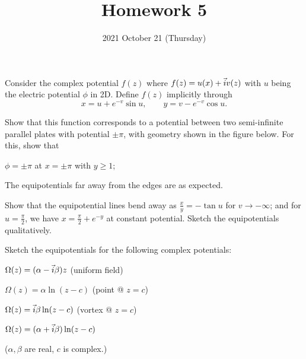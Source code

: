 \documentclass{phys151}
\title{Homework 5}
\date{2021 October 21 (Thursday)}
\author{}
\begin{document}
\begin{problem}
  Consider the complex potential \(f(z)\) where \(f(z) = u(x) + \vec i v(z)\) with
  \(u\) being the electric potential \(\phi\) in 2D.  Define \(f(z)\)
  implicitly through
  \[
    x = u + e^{-v} \sin u, \qquad y = v - e^{-v} \cos u.
  \]
  \begin{subproblems}
  \item Show that this function corresponds to a potential between two
    semi-infinite parallel plates with potential \(\pm\pi\), with geometry
    shown in the figure below.  For this, show that
    \begin{subproblems}
    \item \(\phi = \pm\pi\) at \(x = \pm\pi\) with \(y\ge1\);
    \item The equipotentials far away from the edges are as expected.
    \end{subproblems}
  \item Show that the equipotential lines bend away as \(\frac x y = -\tan
    u\) for \(v \to -\infty\); and for \(u = \frac \pi 2\), we have \(x =
    \frac \pi 2 + e^{-y}\) at constant potential.  Sketch the equipotentials
    qualitatively.
  \end{subproblems}
\end{problem}

\begin{solution}

\end{solution}

\begin{problem}
  Sketch the equipotentials for the following complex potentials:
  \begin{subproblems}
  \item \(\Omega(z) = (\alpha-\vec i\beta) z\) (uniform field)
  \item \(\Omega(z) = \alpha \ln(z-c)\) (point @ \(z=c\))
  \item \(\Omega(z) = \vec i\beta \ln(z-c)\) (vortex @ \(z=c\))
  \item \(\Omega(z) = (\alpha+\vec i\beta) \ln(z-c)\)
  \end{subproblems}
  (\(\alpha, \beta\) are real, \(c\) is complex.)
\end{problem}

\begin{solution}

\end{solution}
\end{document}

